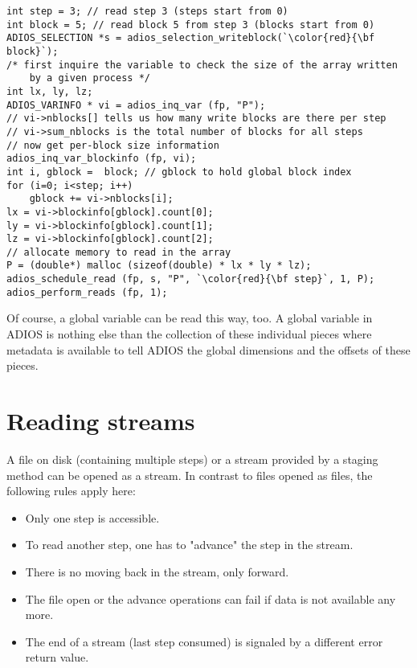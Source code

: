 \begin{lstlisting}[numbers=none, 
                   frame=T,
                   caption={Read an array written by one specific process, when multiple steps are in a file},  
                   label=code:localread3]
int step = 3; // read step 3 (steps start from 0)
int block = 5; // read block 5 from step 3 (blocks start from 0)
ADIOS_SELECTION *s = adios_selection_writeblock(`\color{red}{\bf block}`); 
/* first inquire the variable to check the size of the array written
    by a given process */
int lx, ly, lz;
ADIOS_VARINFO * vi = adios_inq_var (fp, "P");
// vi->nblocks[] tells us how many write blocks are there per step
// vi->sum_nblocks is the total number of blocks for all steps
// now get per-block size information
adios_inq_var_blockinfo (fp, vi);
int i, gblock =  block; // gblock to hold global block index
for (i=0; i<step; i++)
    gblock += vi->nblocks[i];
lx = vi->blockinfo[gblock].count[0];
ly = vi->blockinfo[gblock].count[1];
lz = vi->blockinfo[gblock].count[2];
// allocate memory to read in the array
P = (double*) malloc (sizeof(double) * lx * ly * lz);
adios_schedule_read (fp, s, "P", `\color{red}{\bf step}`, 1, P);
adios_perform_reads (fp, 1);  
\end{lstlisting}


\noindent Of course, a global variable can be read this way, too. A global variable in ADIOS is nothing else than the collection of these individual pieces where metadata is available to tell ADIOS the global dimensions and the offsets of these pieces.





\section{Reading streams}
A file on disk (containing multiple steps) or a stream provided by a staging method can be opened as a stream. In contrast to files opened as files, the following rules apply here:

  \begin{itemize}
  \item Only one step is accessible.
  \item To read another step, one has to "advance" the step in the stream.
  \item There is no moving back in the stream, only forward.
  \item The file open or the advance operations can fail if data is not available any more.
  \item The end of a stream (last step consumed) is signaled by a different error return value.
  \end{itemize}

